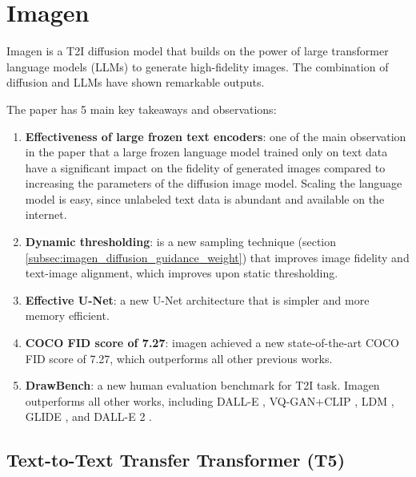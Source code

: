 \section{Imagen}
\label{sec:imagen}

Imagen \cite{imagen} is a T2I diffusion model that builds on the power of large transformer language models \cite{transformer} (LLMs) to generate high-fidelity images. The combination of diffusion and LLMs have shown remarkable outputs. 

The paper has 5 main key takeaways and observations:

\begin{enumerate}
    \item \textbf{Effectiveness of large frozen text encoders}: one of the main observation in the paper that a large frozen language model trained only on text data have a significant impact on the fidelity of generated images compared to increasing the parameters of the diffusion image model. Scaling the language model is easy, since unlabeled text data is abundant and available on the internet.
    \item \textbf{Dynamic thresholding}: is a new sampling technique (section \ref{subsec:imagen_diffusion_guidance_weight}) that improves image fidelity and text-image alignment, which improves upon static thresholding.
    \item \textbf{Effective U-Net}: a new U-Net architecture that is simpler and more memory efficient.
    \item \textbf{COCO FID score of 7.27}: imagen achieved a new state-of-the-art COCO FID score of 7.27, which outperforms all other previous works.
    \item \textbf{DrawBench}: a new human evaluation benchmark for T2I task. Imagen outperforms all other works, including DALL-E \cite{dalle}, VQ-GAN+CLIP \cite{vqgan_clip}, LDM \cite{stable_diffusion}, GLIDE \cite{glide}, and DALL-E 2 \cite{dalle_2}.
\end{enumerate}



















\subsection{Text-to-Text Transfer Transformer (T5)}
\label{subsec:t5}

